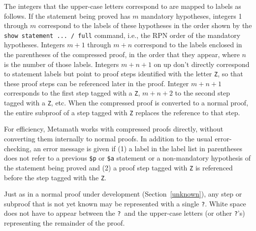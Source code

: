 The integers that the upper-case letters correspond to are mapped to labels as
follows.  If the statement being proved has $m$ mandatory hypotheses, integers
1 through $m$ correspond to the labels of these hypotheses in the order shown
by the \texttt{show statement ... / full} command, i.e., the RPN order of the mandatory
hypotheses.  Integers $m+1$ through $m+n$ correspond to the labels enclosed in
the parentheses of the compressed proof, in the order that they appear, where
$n$ is the number of those labels.  Integers $m+n+1$ on up don't directly
correspond to statement labels but point to proof steps identified with the
letter \texttt{Z}, so that these proof steps can be referenced later in the
proof.  Integer $m+n+1$ corresponds to the first step tagged with a \texttt{Z},
$m+n+2$ to the second step tagged with a \texttt{Z}, etc.  When the compressed
proof is converted to a normal proof, the entire subproof of a step tagged
with \texttt{Z} replaces the reference to that step.

For efficiency, Metamath works with compressed proofs directly, without
converting them internally to normal proofs.  In addition to the usual
error-checking, an error message is given if (1) a label in the label list in
parentheses does not refer to a previous \texttt{\$p} or \texttt{\$a} statement or a
non-mandatory hypothesis of the statement being proved and (2) a proof step
tagged with \texttt{Z} is referenced before the step tagged with the \texttt{Z}.

Just as in a normal proof under development (Section~\ref{unknown}), any step
or subproof that is not yet known may be represented with a single \texttt{?}.
White space does not have to appear between the \texttt{?}\ and the upper-case
letters (or other \texttt{?}'s) representing the remainder of the proof.

